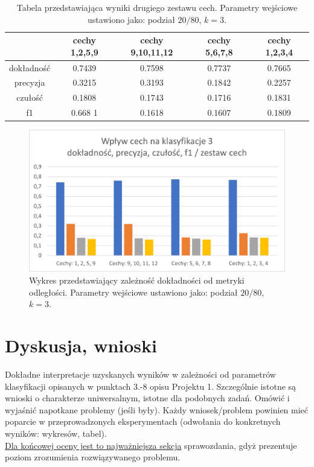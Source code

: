 \documentclass{classrep}
\begin{document}
\begin{table}
\label{tf3}
\begin{tabular}{|c|c|c|c|c|}
\hline  & cechy 1,2,5,9 & cechy 9,10,11,12 & cechy 5,6,7,8 & cechy 1,2,3,4 \\
\hline \hline
dokładność & 0.7439 & 0.7598 & 0.7737 & 0.7665\\
precyzja & 0.3215 & 0.3193 & 0.1842 & 0.2257 \\
czułość & 0.1808 & 0.1743 & 0.1716 & 0.1831\\
f1 & 0.668 1& 0.1618 & 0.1607 & 0.1809 \\
\end{tabular}
\caption{Tabela przedstawiająca wyniki drugiego zestawu cech. Parametry wejściowe ustawiono jako: podział $20/80$, $k=3$.}
\end{table}

\begin{figure}
\label{features_set_3}
\includegraphics[scale=1]{features_set_3}
\caption{Wykres przedstawiający zależność dokładności od metryki odległości. Parametry wejściowe ustawiono jako: podział $20/80$, $k=3$.}
\end{figure}



\section{Dyskusja, wnioski}

Dokładne interpretacje uzyskanych wyników w zależności od parametrów klasyfikacji
opisanych w punktach 3.-8 opisu Projektu 1. 
Szczególnie istotne są wnioski o charakterze uniwersalnym, istotne dla podobnych zadań. 
Omówić i wyjaśnić napotkane problemy (jeśli były). Każdy wniosek/problem powinien mieć poparcie
w przeprowadzonych eksperymentach (odwołania do konkretnych wyników: wykresów,
tabel). \\
\underline{Dla końcowej oceny jest to najważniejsza sekcja} sprawozdania, gdyż prezentuje poziom
zrozumienia rozwiązywanego problemu.\\
\end{document}
